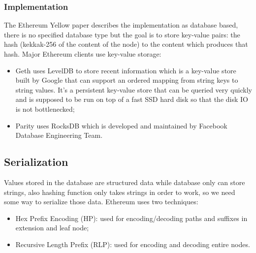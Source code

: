 \subsubsection{Implementation}
The Ethereum Yellow paper describes the implementation as database based, there is no specified database type but the goal is to store key-value pairs: the hash (kekkak-256 of the content of the node) to the content which produces that hash.
Major Ethereum clients use key-value storage:
\begin{itemize}
    \item Geth uses LevelDB to store recent information which is a key-value store built by Google that can support an ordered mapping from string keys to string values.
    It's a persistent key-value store that can be queried very quickly and is supposed to be run on top of a fast SSD hard disk so that the disk IO is not bottlenecked;

    \item Parity uses RocksDB which is developed and maintained by Facebook Database Engineering Team.
\end{itemize}

\subsection{Serialization}
Values stored in the database are structured data while database only can store strings, also hashing function only takes strings in order to work, so we need some way to serialize those data.
Ethereum uses two techniques:
\begin{itemize}
    \item Hex Prefix Encoding (HP): used for encoding/decoding paths and suffixes in extension and leaf node;
    \item Recursive Length Prefix (RLP): used for encoding and decoding entire nodes.
\end{itemize}

